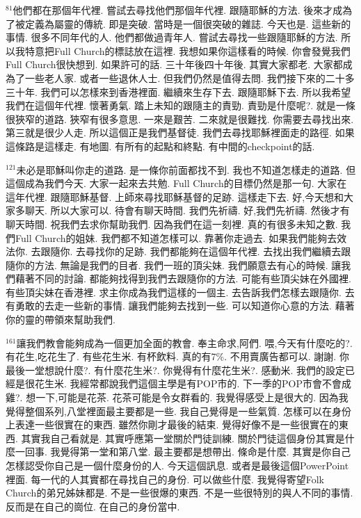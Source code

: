 \documentclass{book}
\begin{document}
$^{81}$他們都在那個年代裡.
嘗試去尋找他們那個年代裡.
跟隨耶穌的方法.
後來才成為了被定義為屬靈的傳統.
即是突破.
當時是一個很突破的雜誌.
今天也是.
這些新的事情.
很多不同年代的人.
他們都做過青年人.
嘗試去尋找一些跟隨耶穌的方法.
所以我特意把Full Church的標誌放在這裡.
我想如果你這樣看的時候.
你會發覺我們Full Church很快想到.
如果許可的話.
三十年後四十年後.
其實大家都老.
大家都成為了一些老人家.
或者一些退休人士.
但我們仍然是值得去問.
我們接下來的二十多三十年.
我們可以怎樣來到香港裡面.
繼續來生存下去.
跟隨耶穌下去.
所以我希望我們在這個年代裡.
懷著勇氣.
踏上未知的跟隨主的責勁.
責勁是什麼呢?.
就是一條很狹窄的道路.
狹窄有很多意思.
一來是艱苦.
二來就是很難找.
你需要去尋找出來.
第三就是很少人走.
所以這個正是我們基督徒.
我們去尋找耶穌裡面走的路徑.
如果這條路是這樣走.
有地圖.
有所有的起點和終點.
有中間的checkpoint的話.

$^{121}$未必是耶穌叫你走的道路.
是一條你前面都找不到.
我也不知道怎樣走的道路.
但這個成為我們今天.
大家一起來去共勉.
Full Church的目標仍然是那一句.
大家在這年代裡.
跟隨耶穌基督.
上師來尋找耶穌基督的足跡.
這樣走下去.
好,今天想和大家多聊天.
所以大家可以.
待會有聊天時間.
我們先祈禱.
好,我們先祈禱.
然後才有聊天時間.
祝我們去求你幫助我們.
因為我們在這一刻裡.
真的有很多未知之數.
我們Full Church的姐妹.
我們都不知道怎樣可以.
靠著你走過去.
如果我們能夠去效法你.
去跟隨你.
去尋找你的足跡.
我們都能夠在這個年代裡.
去找出我們繼續去跟隨你的方法.
無論是我們的目者.
我們一班的頂尖妹.
我們願意去有心的時候.
讓我們藉著不同的討論.
都能夠找得到我們去跟隨你的方法.
可能有些頂尖妹在外國裡.
有些頂尖妹在香港裡.
求主你成為我們這樣的一個主.
去告訴我們怎樣去跟隨你.
去有勇敢的去走一些新的事情.
讓我們能夠去找到一些.
可以知道你心意的方法.
藉著你的靈的帶領來幫助我們.

$^{161}$讓我們教會能夠成為一個更加全面的教會.
奉主命求,阿們.
喂,今天有什麼吃的?.
有花生,吃花生了.
有些花生米.
有杯飲料.
真的有7\%.
不用賣廣告都可以.
謝謝.
你最後一堂想說什麼?.
有什麼花生米?.
你覺得有什麼花生米?.
感動米.
我們的設定已經是很花生米.
我經常都說我們這個主學是有POP市的.
下一季的POP市會不會成雞?.
想一下,可能是花茶.
花茶可能是令女群看的.
我覺得感受上是很大的.
因為我覺得整個系列,八堂裡面最主要都是一些.
我自己覺得是一些氣質.
怎樣可以在身份上表達一些很實在的東西.
雖然你剛才最後的結束.
覺得好像不是一些很實在的東西.
其實我自己看就是.
其實呼應第一堂關於門徒訓練.
關於門徒這個身份其實是什麼一回事.
我覺得第一堂和第八堂.
最主要都是想帶出.
條命是什麼.
其實是你自己怎樣認受你自己是一個什麼身份的人.
今天這個訊息.
或者是最後這個PowerPoint裡面.
每一代的人其實都在尋找自己的身份.
可以做些什麼.
我覺得寄望Folk Church的弟兄姊妹都是.
不是一些很爆的東西.
不是一些很特別的與人不同的事情.
反而是在自己的崗位.
在自己的身份當中.
\end{document}

